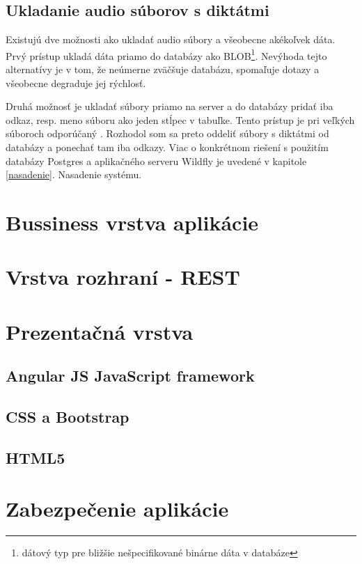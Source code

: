 \documentclass[12pt,oneside]{fithesis2}
\begin{document}
      \subsection{Ukladanie audio súborov s diktátmi} \label{ukladanie}
      \par Existujú dve možnosti ako ukladať audio súbory a všeobecne akékoľvek dáta. Prvý prístup ukladá dáta priamo do databázy ako BLOB\footnote{dátový typ pre bližšie nešpecifikované binárne dáta v databáze}. Nevýhoda tejto alternatívy je v tom, že neúmerne zväčšuje databázu, spomaľuje dotazy a všeobecne degraduje jej rýchlosť.
      \par Druhá možnosť je ukladať súbory priamo na server a do databázy pridať iba odkaz, resp. meno súboru ako jeden stĺpec v tabuľke. Tento prístup je pri veľkých súboroch odporúčaný \cite{sof1}. Rozhodol som sa preto oddeliť súbory s diktátmi od databázy a ponechať tam iba odkazy. Viac o konkrétnom riešení s použitím databázy Postgres a aplikačného serveru Wildfly je uvedené v kapitole \ref{nasadenie}. Nasadenie systému.
      \section{Bussiness vrstva aplikácie}
      \section{Vrstva rozhraní - REST}
      \section{Prezentačná vrstva}
      		\subsection{Angular JS JavaScript framework}
      		\subsection{CSS a Bootstrap}
      		\subsection{HTML5}
      		\pagebreak
      \section{Zabezpečenie aplikácie}
\end{document}

